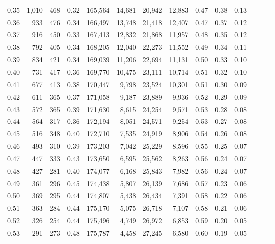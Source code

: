 \begin{tabular}{rrrrrrrrrrrrrr}
0.35 &   1,010 &  468 &  0.32 &  165,564 &   14,681 &  20,942 &  12,883 &  0.47 &  0.38 &      0.13 \\
0.36 &     933 &  476 &  0.34 &  166,497 &   13,748 &  21,418 &  12,407 &  0.47 &  0.37 &      0.12 \\
0.37 &     916 &  450 &  0.33 &  167,413 &   12,832 &  21,868 &  11,957 &  0.48 &  0.35 &      0.12 \\
0.38 &     792 &  405 &  0.34 &  168,205 &   12,040 &  22,273 &  11,552 &  0.49 &  0.34 &      0.11 \\
0.39 &     834 &  421 &  0.34 &  169,039 &   11,206 &  22,694 &  11,131 &  0.50 &  0.33 &      0.10 \\
0.40 &     731 &  417 &  0.36 &  169,770 &   10,475 &  23,111 &  10,714 &  0.51 &  0.32 &      0.10 \\
0.41 &     677 &  413 &  0.38 &  170,447 &    9,798 &  23,524 &  10,301 &  0.51 &  0.30 &      0.09 \\
0.42 &     611 &  365 &  0.37 &  171,058 &    9,187 &  23,889 &   9,936 &  0.52 &  0.29 &      0.09 \\
0.43 &     572 &  365 &  0.39 &  171,630 &    8,615 &  24,254 &   9,571 &  0.53 &  0.28 &      0.08 \\
0.44 &     564 &  317 &  0.36 &  172,194 &    8,051 &  24,571 &   9,254 &  0.53 &  0.27 &      0.08 \\
0.45 &     516 &  348 &  0.40 &  172,710 &    7,535 &  24,919 &   8,906 &  0.54 &  0.26 &      0.08 \\
0.46 &     493 &  310 &  0.39 &  173,203 &    7,042 &  25,229 &   8,596 &  0.55 &  0.25 &      0.07 \\
0.47 &     447 &  333 &  0.43 &  173,650 &    6,595 &  25,562 &   8,263 &  0.56 &  0.24 &      0.07 \\
0.48 &     427 &  281 &  0.40 &  174,077 &    6,168 &  25,843 &   7,982 &  0.56 &  0.24 &      0.07 \\
0.49 &     361 &  296 &  0.45 &  174,438 &    5,807 &  26,139 &   7,686 &  0.57 &  0.23 &      0.06 \\
0.50 &     369 &  295 &  0.44 &  174,807 &    5,438 &  26,434 &   7,391 &  0.58 &  0.22 &      0.06 \\
0.51 &     363 &  284 &  0.44 &  175,170 &    5,075 &  26,718 &   7,107 &  0.58 &  0.21 &      0.06 \\
0.52 &     326 &  254 &  0.44 &  175,496 &    4,749 &  26,972 &   6,853 &  0.59 &  0.20 &      0.05 \\
0.53 &     291 &  273 &  0.48 &  175,787 &    4,458 &  27,245 &   6,580 &  0.60 &  0.19 &      0.05 \\

\end{tabular}
